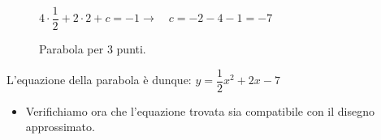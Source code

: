 \begin{esempio}
\begin{figure}[h]
\begin{minipage}{.60\textwidth}
\begin{itemize}
\(4 \cdot \dfrac{1}{2} +2 \cdot 2 +c=-1 \rightarrow \quad c=-2-4-1=-7\)

 \end{itemize}

\end{minipage}
\begin{minipage}{.40\textwidth}
\begin{inaccessibleblock}[Parabola di equazione \(y=x^2\).]
\centering
\scalebox{.8}{  \parabolapertrepunti}
  \caption{Parabola per 3 punti.} \label{fig:parabola_parabola3punti}
\end{inaccessibleblock}
\end{minipage}
\end{figure}
L'equazione della parabola è dunque: \(y=\dfrac{1}{2}x^2+2x-7\)

 \begin{itemize}
  \item Verifichiamo ora che l'equazione trovata sia compatibile con il 
  disegno approssimato.
 \end{itemize}
\end{esempio}


